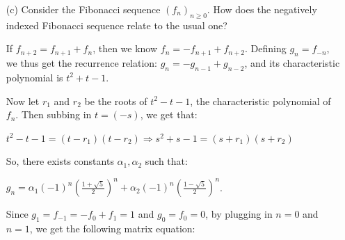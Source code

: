 \documentclass{book}
\newcommand{\exOne}{%
   \color{Purple}%
   \fontsize{13}{15}\selectfont%
}
\newenvironment{myIndent}{%
   \begin{adjustwidth}{2.5em}{0em}%
}{%
   \end{adjustwidth}%
}
\newcommand{\retTwo}{\hfill\bigbreak}
\begin{document}
\begin{enumerate}
   \begin{myIndent}\exOne
      If $N < 0$, we can still inductively apply the identity we found on the last\\ [2pt] page: $b_N = \frac{1}{c_d}b_{N + d} - \frac{c_1}{c_d}b_{N + d - 1} - \ldots - \frac{c_{d-1}}{c_d}b_{N + 1}$ in order to uniquely solve\\ [3pt] for $b_N$ such that $b_{N + d} = c_1b_{N + d - 1} + \ldots + c_db_{N}$.\retTwo

      Hence, given a sequence $(a_n)_{n \geq 0}$ satisfying a linear recurrence relation of order $d$: $a_n = c_1a_{n-1} + \ldots + c_da_{n-d}$, we define $b_n = a_n$ when $n \geq 0$. Meanwhile, when $n < 0$, we inductively define $b_n$ as:
      
      {\centering $b_n = \frac{1}{c_d}b_{n + d}- \frac{c_1}{c_d}b_{n + d - 1} - \ldots - \frac{c_{d-1}}{c_d}b_{n + 1}$.\retTwo\par}

      Then $(b_n)_{n \in \mathbb{Z}}$ is the unique sequence satisfying the problem's requirements.\retTwo
   \end{myIndent}

   \item[(c)] Consider the Fibonacci sequence $(f_n)_{n \geq 0}$. How does the negatively indexed Fibonacci sequence relate to the usual one?
   
   \begin{myIndent}\exOne
      If $f_{n+2} = f_{n+1} + f_{n}$, then we know $f_{n} = - f_{n+1} + f_{n + 2}$. Defining $g_{n} = f_{-n}$, we thus get the recurrence relation: $g_n = -g_{n-1} + g_{n-2}$, and its characteristic polynomial is $t^2 + t - 1$.\retTwo

      Now let $r_1$ and $r_2$ be the roots of $t^2 - t - 1$, the characteristic polynomial of $f_n$. Then subbing in $t = (-s)$, we get that:

      {\centering $t^2 - t - 1 = (t - r_1)(t - r_2) \Longrightarrow s^2 + s - 1 = (s + r_1)(s + r_2)$\retTwo\par}

      So, there exists constants $\alpha_1, \alpha_2$ such that:
      
      {\centering $g_n = \alpha_1(-1)^n\left(\frac{1+\sqrt{5}}{2}\right)^n + \alpha_2(-1)^n\left(\frac{1-\sqrt{5}}{2}\right)^n$.\retTwo\par}

      Since $g_{1} = f_{-1} = -f_0 + f_1 = 1$ and $g_0 = f_0 = 0$, by plugging in $n = 0$ and $n = 1$, we get the following matrix equation:


\end{myIndent}
\end{enumerate}
\end{document}
